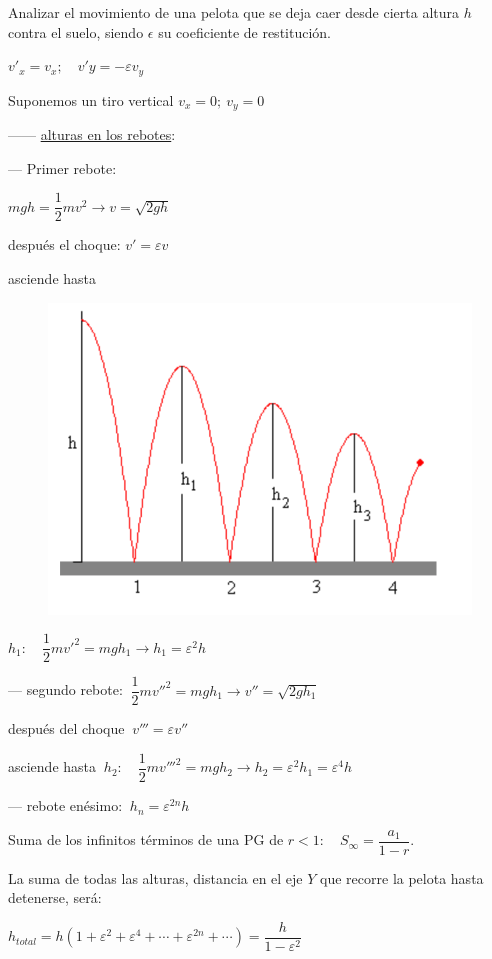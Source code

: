 \vspace{5mm} %
\begin{prob}
Analizar el movimiento de una pelota que se deja caer desde cierta altura $h$ contra el suelo, siendo $\epsilon$ su coeficiente de restitución.	
\end{prob}

\begin{multicols}{2}
$v'_x=v_x; \quad v'y=-\varepsilon v_y$

Suponemos un tiro vertical $v_x=0; \ v_y=0$

------ \underline{alturas en los rebotes}:

--- Primer rebote:

$mgh=\dfrac 1 2 m v^2 \to v=\sqrt{2gh}$

después el choque: $v'=\varepsilon v$

asciende hasta 
\begin{figure}[H]
	\centering
	\includegraphics[width=.55\textwidth]{imagenes/imagenes17/T17IM12.png}
	\end{figure}	
\end{multicols}
$h_1: \quad \dfrac 1 2 m {v'}^2=mgh_1 \to h_1=\varepsilon^2 h$

--- segundo rebote: $\ \dfrac 1 2 m v''^2=mgh_1 \to v''=\sqrt{2gh_1}$

después del choque $\ v'''=\varepsilon v''$

asciende hasta $\ h_2:\quad \dfrac 1 2 m {v'''}^2=mgh_2 \to h_2=\varepsilon^2 h_1=\varepsilon^4 h$

--- rebote enésimo: $\ h_n=\varepsilon^{2n} h$

\textcolor{gris}{Suma de los infinitos términos de una PG de $r<1:\quad S_{\infty}=\dfrac{a_1}{1-r}$.}

La suma de todas las alturas, distancia en el eje $Y$ que recorre la pelota hasta detenerse, será:

$h_{total}=h(1+\varepsilon^2+\varepsilon^4+\cdots +\varepsilon^{2n}+\cdots )=\dfrac {h}{1-\varepsilon^2}$

